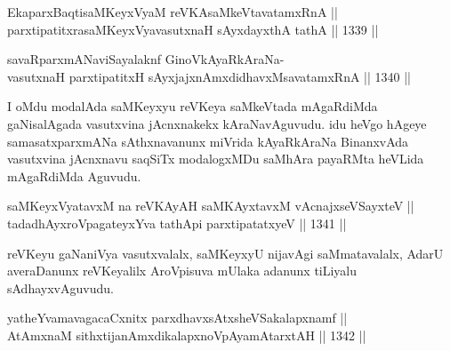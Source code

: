 \begin{shl}
\footnotemark[1]EkaparxBaqtisaMKeyxVyaM reVKAsaMkeVtavatamxRnA || \\
parxtipatitxrasaMKeyxVyavasutxnaH sAyxdayxthA tathA ||  1339 ||  
\end{shl}
				
\begin{shl}
savaRparxmANaviSayalaknf GinoV\s kAyaRkAraNa-\\
vasutxnaH parxtipatitxH sAyxjajxnAmxdidhavxMsavatamxRnA ||  1340 ||  
\end{shl}

\begin{artha}
I oMdu modalAda saMKeyxyu reVKeya saMkeVtada mAgaRdiMda gaNisalAgada vasutxvina jAcnxnakekx kAraNavAguvudu. idu heVgo hAgeye samasatxparxmANa sAthxnavanunx miVrida kAyaRkAraNa BinanxvAda vasutxvina jAcnxnavu saqSiTx modalogxMDu saMhAra payaRMta heVLida mAgaRdiMda Aguvudu.
\end{artha}


\begin{shl}
saMKeyxVyatavxM na reVKAyAH saMKAyxtavxM vA\s cnajxseVSayxteV  || \\
tadadhAyxroVpagateyxYva tathA\s pi parxtipatatxyeV ||  1341 ||  
\end{shl}

\begin{artha}
reVKeyu gaNaniVya vasutxvalalx, saMKeyxyU nijavAgi saMmatavalalx, AdarU averaDanunx reVKeyalilx AroVpisuva mUlaka adanunx tiLiyalu sAdhayxvAguvudu.
\end{artha}

\begin{shl}
yatheYvamavagacaCxnitx parxdhavxsAtxsheVSakalapxnamf || \\
AtAmxnaM sithxtijanAmxdikalapxnoVpAyamAtarxtAH ||  1342 ||  
\end{shl}

